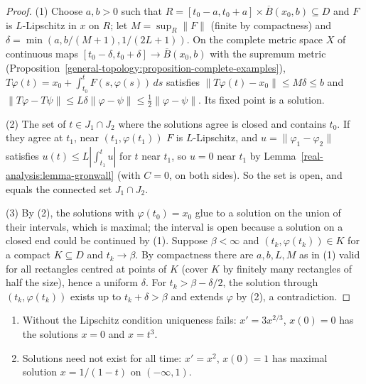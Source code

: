\begin{proof}
(1) Choose $a, b > 0$ such that $R = [t_0 - a, t_0 + a] \times \overline{B}(x_0, b) \subseteq D$ and $F$ is $L$-Lipschitz in $x$ on $R$; let $M = \sup_R\|F\|$ (finite by compactness) and
$\delta = \min(a, b/(M+1), 1/(2L+1))$. On the complete metric space $X$ of continuous maps $[t_0 - \delta, t_0 + \delta] \to \overline{B}(x_0, b)$ with the supremum metric
(Proposition~\ref{general-topology:proposition-complete-examples}), $T\varphi(t) = x_0 + \int_{t_0}^tF(s, \varphi(s))\,ds$ satisfies $\|T\varphi(t) - x_0\| \leq M\delta \leq b$ and
$\|T\varphi - T\psi\| \leq L\delta\|\varphi - \psi\| \leq \frac12\|\varphi - \psi\|$. Its fixed point is a solution.

(2) The set of $t \in J_1 \cap J_2$ where the solutions agree is closed and contains $t_0$. If they agree at $t_1$, near $(t_1, \varphi(t_1))$ $F$ is $L$-Lipschitz, and $u = \|\varphi_1 - \varphi_2\|$ satisfies
$u(t) \leq L|\int_{t_1}^tu|$ for $t$ near $t_1$, so $u = 0$ near $t_1$ by Lemma~\ref{real-analysis:lemma-gronwall} (with $C = 0$, on both sides). So the set is open, and equals the connected set
$J_1 \cap J_2$.

(3) By (2), the solutions with $\varphi(t_0) = x_0$ glue to a solution on the union of their intervals, which is maximal; the interval is open because a solution on a closed end could be continued by (1).
Suppose $\beta < \infty$ and $(t_k, \varphi(t_k)) \in K$ for a compact $K \subseteq D$ and $t_k \to \beta$. By compactness there are $a, b, L, M$ as in (1) valid for all rectangles centred at points of $K$
(cover $K$ by finitely many rectangles of half the size), hence a uniform $\delta$. For $t_k > \beta - \delta/2$, the solution through $(t_k, \varphi(t_k))$ exists up to $t_k + \delta > \beta$ and extends
$\varphi$ by (2), a contradiction.
\end{proof}

\begin{counterexample}\label{real-analysis:counterexample-ode}
\begin{enumerate}
\item Without the Lipschitz condition uniqueness fails: $x' = 3x^{2/3}$, $x(0) = 0$ has the solutions $x = 0$ and $x = t^3$.
\item Solutions need not exist for all time: $x' = x^2$, $x(0) = 1$ has maximal solution $x = 1/(1 - t)$ on $(-\infty, 1)$.
\end{enumerate}
\end{counterexample}

